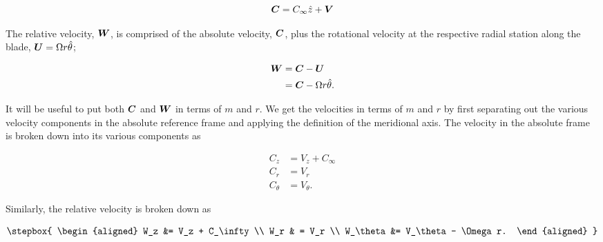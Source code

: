 \begin{equation}
    \bm{C} = C_\infty \hat{z} + \bm{V}
\end{equation}

The relative velocity, \(\bm{W}\), is comprised of the absolute velocity, \(\bm{C}\), plus the rotational velocity at the respective radial station along the blade, \(\bm{U} = \Omega r \hat{\theta}\);

\begin{equation}
    \begin{aligned}
        \bm{W} &= \bm{C} - \bm{U}\\
                 &= \bm{C} - \Omega r \hat{\theta}.
    \end{aligned}
\end{equation}

It will be useful to put both \(\bm{C}\) and \(\bm{W}\) in terms of \(m\) and \(r\).
%
We get the velocities in terms of \(m\) and \(r\) by first separating out the various velocity components in the absolute reference frame and applying the definition of the meridional axis.
%
The velocity in the absolute frame is broken down into its various components as

\begin{equation}
    \label{eqn:absolutevelocities}
    \begin{aligned}
        C_z &= V_z +  C_\infty \\
        C_r & = V_r  \\
        C_\theta &= V_\theta.
    \end{aligned}
\end{equation}

Similarly, the relative velocity is broken down as

\begin{equation}
    \label{eqn:relativevelocities}
    \stepbox{
        \begin{aligned}
            W_z &= V_z + C_\infty \\
            W_r & = V_r \\
            W_\theta &= V_\theta - \Omega r.
        \end{aligned}
    }
\end{equation}

